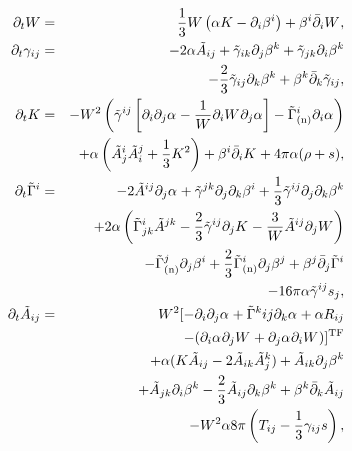 \documentclass[useAMS,usenatbib]{iopart}
\begin{document}
\begin{eqnarray}
  \dt{W} & = & \frac{1}{3} W \left ( \alpha K - \pdu{\beta}{i}{i} \right) + \upwindu{W}{}{i}, \\
  \dt{\gamma_{ij}} & = & -2\alpha \tlA_{ij} + \tlg_{ik} \pdu{\beta}{k}{j}
                         + \tlg_{jk} \pdu{\beta}{k}{i} \nonumber\\
                       & &  -\frac{2}{3} \tlg_{ij} \pdu{\beta}{k}{k}
                         + \upwindl{\tlg}{ij}{k}, \\
  \dt{K} & = & -\emfpW \left ( \tlg^{ij} \left [ \pdpdu{\alpha}{}{i}{j}
               -\frac{1}{W}\pdu{W}{}{i}\pdu{\alpha}{}{j} \right ] 
               - \tlGn^{i}\pdu{\alpha}{}{i} \right ) \nonumber \\
         &   & + \alpha \left ( \tlA^{i}_{j} \tlA^{j}_{i} +\frac{1}{3} K^2
               \right ) + \upwindu{K}{}{i} + 4 \pi \alpha ( \rho + s ), \\
  \dt{\tlG^{i}} & = & -2 \tlA^{ij} \pdu{\alpha}{}{j} +\tlg^{jk} \pdpdu{\beta}{i}{j}{k} + \frac{1}{3}
                    \tlg^{ij} \pdpdu{\beta}{k}{j}{k}  \nonumber\\
 & &+  2 \alpha \left (
                    \tlG^{i}_{jk} \tlA^{jk} - \frac{2}{3} \tlg^{ij}
                    \pdu{K}{}{j} - \frac{3}{W} \tlA^{ij} \pdu{W}{}{j}\right ) 
                    \nonumber \\
                &   &  -\tlGn^{j}\pdu{\beta}{i}{j}
                    + \frac{2}{3} \tlGn^{i}\pdu{\beta}{j}{j} 
                + \upwindu{\tlG}{i}{j} \nonumber\\
                & & -16 \pi \alpha \tlg^{ij} s_j, \\
  \dt{\tlA_{ij}} & = & \emfpW [ -\pdpdu{\alpha}{}{i}{j} + \tlG^{k}{ij}
                       \pdu{\alpha}{}{k} +\alpha R_{ij} \nonumber\\
                      & &- 
                     ( \pdu{\alpha}{}{i}
                       \pdu{W}{}{j}+\pdu{\alpha}{}{j} \pdu{W}{}{i} )
                       ]^{\mathrm{TF}} \nonumber \\
                 &   & +\alpha ( K \tlA_{ij}- 2 \tlA_{ik} \tlA^{k}_{j} )
                       + \tlA_{ik} \pdu{\beta}{k}{j} \nonumber \\
                  & &     + \tlA_{jk} \pdu{\beta}{k}{i}
                       - \frac{2}{3} \tlA_{ij} \pdu{\beta}{k}{k}  +\upwindl{\tlA}{ij}{k}  \nonumber \\
                 &   &  - \emfpW \alpha 8 \pi
                       \left (T_{ij}-\frac{1}{3} \gamma_{ij} s\right ),
\end{eqnarray}
\end{document}
